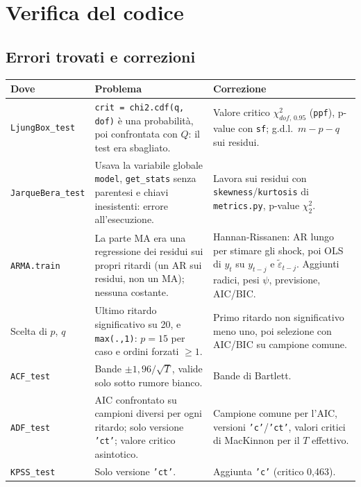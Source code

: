 \documentclass[11pt,a4paper]{article}
\begin{document}
\section{Verifica del codice}

\subsection{Errori trovati e correzioni}

\begin{center}
\small
\begin{tabular}{>{\raggedright\arraybackslash}p{3.2cm}>{\raggedright\arraybackslash}p{5.9cm}>{\raggedright\arraybackslash}p{5.5cm}}
\toprule
Dove & Problema & Correzione \\
\midrule
\texttt{LjungBox\_test} & \texttt{crit = chi2.cdf(q, dof)} è una probabilità, poi confrontata con $Q$: il test era sbagliato. & Valore critico $\chi^2_{dof,\,0.95}$ (\texttt{ppf}), p-value con \texttt{sf}; g.d.l.\ $m-p-q$ sui residui. \\
\texttt{JarqueBera\_test} & Usava la variabile globale \texttt{model}, \texttt{get\_stats} senza parentesi e chiavi inesistenti: errore all'esecuzione. & Lavora sui residui con \texttt{skewness}/\texttt{kurtosis} di \texttt{metrics.py}, p-value $\chi^2_2$. \\
\texttt{ARMA.train} & La parte MA era una regressione dei residui sui propri ritardi (un AR sui residui, non un MA); nessuna costante. & Hannan-Rissanen: AR lungo per stimare gli shock, poi OLS di $y_t$ su $y_{t-j}$ e $\tilde\varepsilon_{t-j}$. Aggiunti radici, pesi $\psi$, previsione, AIC/BIC. \\
Scelta di $p$, $q$ & Ultimo ritardo significativo su 20, e \texttt{max(.,1)}: $p = 15$ per caso e ordini forzati $\ge 1$. & Primo ritardo non significativo meno uno, poi selezione con AIC/BIC su campione comune. \\
\texttt{ACF\_test} & Bande $\pm1{,}96/\sqrt T$, valide solo sotto rumore bianco. & Bande di Bartlett. \\
\texttt{ADF\_test} & AIC confrontato su campioni diversi per ogni ritardo; solo versione \texttt{'ct'}; valore critico asintotico. & Campione comune per l'AIC, versioni \texttt{'c'}/\texttt{'ct'}, valori critici di MacKinnon per il $T$ effettivo. \\
\texttt{KPSS\_test} & Solo versione \texttt{'ct'}. & Aggiunta \texttt{'c'} (critico 0,463). \\

\end{tabular}
\end{center}
\end{document}
